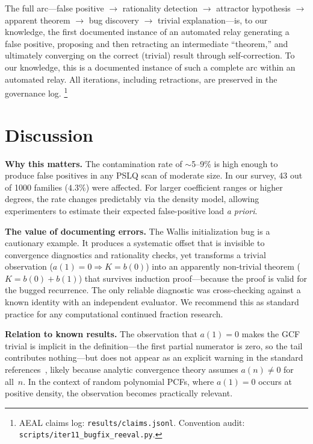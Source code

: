 \documentclass[11pt]{amsart}
\theoremstyle{definition}
\theoremstyle{remark}
\begin{document}
The full arc---false positive $\to$ rationality detection $\to$
attractor hypothesis $\to$ apparent theorem $\to$ bug discovery
$\to$ trivial explanation---is, to our knowledge, the first documented
instance of an automated relay generating a false positive,
proposing and then retracting an intermediate ``theorem,''  and
ultimately converging on the correct (trivial) result
through self-correction.
To our knowledge, this is a documented instance of such a complete
arc within an automated relay.
All iterations, including retractions, are preserved in the
governance log.%
\footnote{AEAL claims log: \texttt{results/claims.jsonl}.
  Convention audit: \texttt{scripts/iter11\_bugfix\_reeval.py}.}

\section{Discussion}\label{sec:discussion}

\textbf{Why this matters.}
The contamination rate of $\sim$5--9\% is high enough to produce
false positives in any PSLQ scan of moderate size.
In our survey, 43 out of 1000 families ($4.3\%$) were affected.
For larger coefficient ranges or higher degrees, the rate changes
predictably via the density model, allowing experimenters to
estimate their expected false-positive load \emph{a priori}.

\textbf{The value of documenting errors.}
The Wallis initialization bug is a cautionary example.
It produces a systematic offset that is invisible to convergence
diagnostics and rationality checks, yet transforms a trivial
observation ($a(1)=0 \Rightarrow K=b(0)$) into an apparently
non-trivial theorem ($K=b(0)+b(1)$) that survives induction
proof---because the proof is valid for the bugged recurrence.
The only reliable diagnostic was cross-checking against a known
identity with an independent evaluator.
We recommend this as standard practice for any computational
continued fraction research.

\textbf{Relation to known results.}
The observation that $a(1)=0$ makes the GCF trivial is implicit
in the definition---the first partial numerator is zero, so the
tail contributes nothing---but does not appear as an explicit
warning in the standard references~\cite{lorentzen-waadeland},
likely because analytic convergence theory assumes $a(n)\ne 0$
for all~$n$.
In the context of random polynomial PCFs, where $a(1)=0$ occurs
at positive density, the observation becomes practically relevant.
\end{document}
